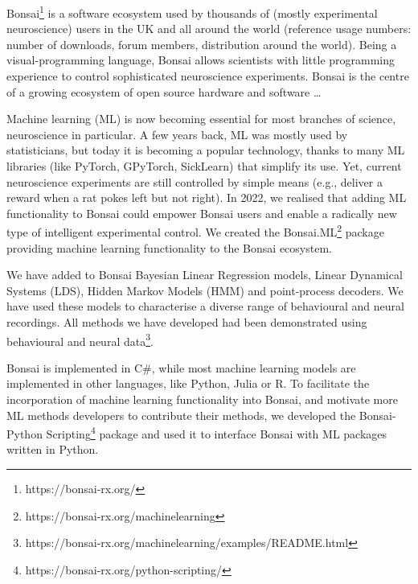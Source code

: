 
Bonsai\footnote[1]{https://bonsai-rx.org/} is a software ecosystem used by thousands
of (mostly experimental neuroscience) users in the UK and all around the world
(reference usage numbers: number of downloads, forum members, distribution
around the world).
%
Being a visual-programming language, Bonsai allows scientists with little
programming experience to control sophisticated neuroscience experiments.
%
Bonsai is the centre of a growing ecosystem of open source hardware and
software \ldots



Machine learning (ML) is now becoming essential for most branches of science,
neuroscience in particular.
%
A few years back, ML was mostly used by statisticians, but today it is becoming
a popular technology, thanks to many ML libraries (like PyTorch, GPyTorch, SickLearn)
that simplify its use.
%
Yet, current neuroscience experiments are still controlled by simple means
(e.g., deliver a reward when a rat pokes left but not right).
%
In 2022, we realised that adding ML functionality to Bonsai could empower
Bonsai users and enable a radically new type of intelligent experimental
control.
%
%
We created the Bonsai.ML\footnote[2]{https://bonsai-rx.org/machinelearning}
package providing machine learning functionality to the Bonsai ecosystem.


We have added to Bonsai Bayesian Linear Regression models, Linear Dynamical
Systems (LDS), Hidden Markov Models (HMM) and point-process decoders.
%
We have used these models to characterise a diverse range of behavioural and
neural recordings.
%
All methods we have developed had been demonstrated using behavioural and
neural data\footnote[3]{https://bonsai-rx.org/machinelearning/examples/README.html}.

Bonsai is implemented in C\#, while most machine learning models are
implemented in other languages, like Python, Julia or R.
%
To facilitate the incorporation of machine learning functionality into Bonsai,
and motivate more ML methods developers to contribute their methods, we
developed the Bonsai-Python
Scripting\footnote[4]{https://bonsai-rx.org/python-scripting/}
package and used it to interface Bonsai with ML packages written in Python.

